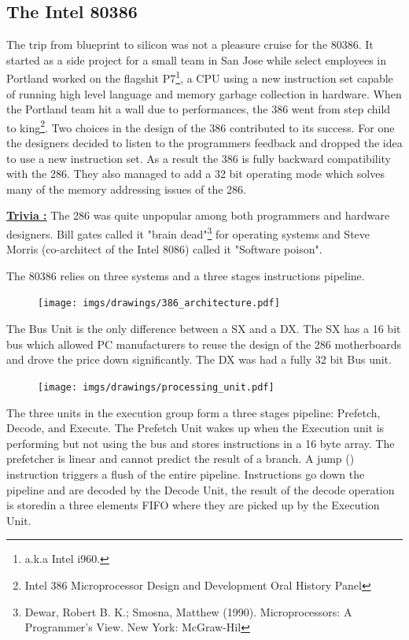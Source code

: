 \documentclass[book.tex]{subfiles}
\begin{document}
\subsection{The Intel 80386}
The trip from blueprint to silicon was not a pleasure cruise for the 80386. It started as a side project for a small team in San Jose while select employees in Portland worked on the flagshit P7\footnote{a.k.a Intel i960.}, a CPU using a new instruction set capable of running high level language and memory garbage collection in hardware. When the Portland team hit a wall due to performances, the 386 went from step child to king\footnote{Intel 386 Microprocessor Design and Development Oral History Panel}. Two choices in the design of the 386 contributed to its success. For one the designers decided to listen to the programmers feedback and dropped the idea to use a new instruction set. As a result the 386 is fully backward compatibility with the 286. They also managed to add a 32 bit operating mode which solves many of the memory addressing issues of the 286.\\
\par
\textbf{\underline{Trivia :}}  The 286 was quite unpopular among both programmers and hardware designers. Bill gates called it "brain dead"\footnote{Dewar, Robert B. K.; Smosna, Matthew (1990). Microprocessors: A Programmer's View. New York: McGraw-Hil} for operating systems and Steve Morris (co-architect of the Intel 8086) called it "Software poison".\\
\par
The 80386 relies on three systems and a three stages instructions pipeline.\\
\par
\begin{figure}[H]
\centering
\texttt{[image: imgs/drawings/386\_architecture.pdf]}
\end{figure}
\par
The Bus Unit is the only difference between a SX and a DX. The SX has a 16 bit bus which allowed PC manufacturers to reuse the design of the 286 motherboards and drove the price down significantly. The DX was had a fully 32 bit Bus unit.
\par
\begin{figure}[H]
\centering
\texttt{[image: imgs/drawings/processing\_unit.pdf]}
\end{figure}
\par
The three units in the execution group form a three stages pipeline: Prefetch, Decode, and Execute. The Prefetch Unit wakes up when the Execution unit is performing but not using the bus and stores instructions in a 16 byte array. The prefetcher is linear and cannot predict the result of a branch. A jump () instruction triggers a flush of the entire pipeline. Instructions go down the pipeline and are decoded by the Decode Unit, the result of the decode operation is storedin a three elements FIFO where they are picked up by the Execution Unit.\\
\par
\end{document}
